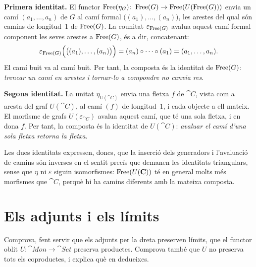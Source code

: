 \begin{solucio}
\textbf{Primera identitat.} El functor $\operatorname{Free}(\eta_G)\colon\operatorname{Free}(G)\to\operatorname{Free}(U(\operatorname{Free}(G)))$ envia un camí $(a_1,\dots,a_n)$ de $G$ al camí formal $\bigl((a_1),\dots,(a_n)\bigr)$, les arestes del qual són camins de longitud~$1$ de $\operatorname{Free}(G)$. La counitat $\varepsilon_{\operatorname{Free}(G)}$ avalua aquest camí formal component les seves arestes a $\operatorname{Free}(G)$, és a dir, concatenant:
\[
\varepsilon_{\operatorname{Free}(G)}\Bigl(\bigl((a_1),\dots,(a_n)\bigr)\Bigr)=(a_n)\circ\cdots\circ(a_1)=(a_1,\dots,a_n).
\]
El camí buit va al camí buit. Per tant, la composta és la identitat de $\operatorname{Free}(G)$: \emph{trencar un camí en arestes i tornar-lo a compondre no canvia res}.

\textbf{Segona identitat.} La unitat $\eta_{U(\cat{C})}$ envia una fletxa $f$ de $\cat{C}$, vista com a aresta del graf $U(\cat{C})$, al camí $(f)$ de longitud~$1$, i cada objecte a ell mateix. El morfisme de grafs $U(\varepsilon_{\cat{C}})$ avalua aquest camí, que té una sola fletxa, i en dona $f$. Per tant, la composta és la identitat de $U(\cat{C})$: \emph{avaluar el camí d'una sola fletxa retorna la fletxa}.

Les dues identitats expressen, doncs, que la inserció dels generadors i l'avaluació de camins són inverses en el sentit precís que demanen les identitats triangulars, sense que $\eta$ ni $\varepsilon$ siguin isomorfismes: $\operatorname{Free}(U(\mathbf{C}))$ té en general molts més morfismes que $\cat{C}$, perquè hi ha camins diferents amb la mateixa composta.
\end{solucio}

\section{Els adjunts i els límits}

\begin{exercici}\label{pr-rapl-mon}
Comprova, fent servir que els adjunts per la dreta preserven límits, que el functor oblit $U\colon\cat{Mon}\to\cat{Set}$ preserva productes. Comprova també que $U$ no preserva tots els coproductes, i explica què en dedueixes.
\end{exercici}

